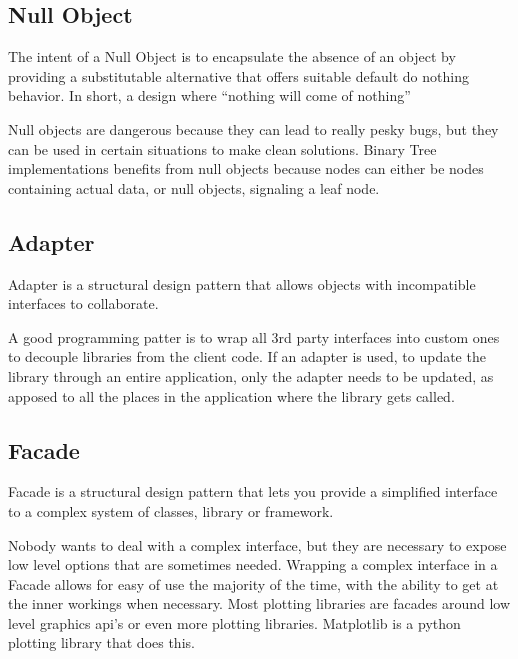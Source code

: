 \documentclass{article}
\begin{document}
\subsection{Null Object}

\begin{displayquote}
The intent of a Null Object is to encapsulate the absence of an object by providing a substitutable alternative that offers suitable default do nothing behavior. In short, a design where ``nothing will come of nothing'' \cite{guru}
\end{displayquote}

Null objects are dangerous because they can lead to really pesky bugs, but they can be used in certain
situations to make clean solutions. Binary Tree implementations benefits from null objects because nodes can either be
nodes containing actual data, or null objects, signaling a leaf node.

\subsection{Adapter}

\begin{displayquote}
Adapter is a structural design pattern that allows objects with incompatible interfaces
to collaborate.  \cite{guru}
\end{displayquote}

A good programming patter is to wrap all 3rd party interfaces into custom ones to decouple
libraries from the client code. If an adapter is used, to update the library through an entire
application, only the adapter needs to be updated, as apposed to all the places in the application
where the library gets called.

\subsection{Facade}

\begin{displayquote}
Facade is a structural design pattern that lets you provide a simplified interface to a complex system
of classes, library or framework.  \cite{guru}
\end{displayquote}

Nobody wants to deal with a complex interface, but they are necessary to expose low level options that
are sometimes needed. Wrapping a complex interface in a Facade allows for easy of use the majority of
the time, with the ability to get at the inner workings when necessary. Most plotting libraries are
facades around low level graphics api's or even more plotting libraries. Matplotlib is a python plotting
library that does this. \cite{matplotlib}
\end{document}
